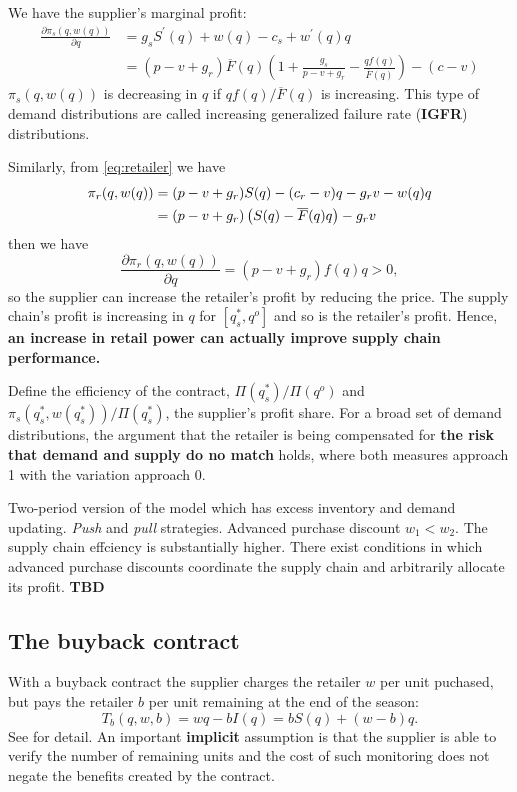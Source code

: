 We have the supplier's marginal profit:
\begin{align*}
    \frac{\partial\pi_s(q,w(q))}{\partial q}&=g_s S^\prime(q)+w(q)-c_s+w^\prime(q)q\\
    &=(p-v+g_r)\overline{F}(q)\left(1+\frac{g_s}{p-v+g_r}-\frac{q f(q)}{\overline{F}(q)}\right)-(c-v)
\end{align*}
$\pi_s(q,w(q))$ is decreasing in $q$ if $qf(q)/\overline{F}(q)$ is increasing. This type of demand distributions are called increasing generalized failure rate (\textbf{IGFR}) distributions.

Similarly, from \ref{eq:retailer} we have 
\begin{align*}
    \pi_r(q,w(q))&=(p-v+g_r)S(q)-(c_r-v)q-g_rv-w(q)q\\
    &=(p-v+g_r)\left(S(q)-\overline{F}(q) q\right)-g_rv
\end{align*}
then we have 
\begin{equation*}
    \frac{\partial\pi_r(q,w(q))}{\partial q}=(p-v+g_r)f(q)q>0,
\end{equation*}
so the supplier can increase the retailer's profit by reducing the price. 
The supply chain's profit is increasing in $q$ for $[q_s^*,q^o]$ and so is the retailer's profit. Hence, \textbf{an increase in retail power can actually improve supply chain performance.} 

Define the efficiency of the contract, $\Pi(q_s^*)/\Pi(q^o)$ and $\pi_s(q_s^*,w(q_s^*))/\Pi(q_s^*)$, the supplier's profit share. For a broad set of demand distributions, the argument that the retailer is being compensated for \textbf{the risk that demand and supply do no match} holds, where both measures approach 1 with the variation approach 0.\cite{lariviere_selling_2001}

Two-period version of the model which has excess inventory and demand updating. \textit{Push} and \textit{pull} strategies. Advanced purchase discount $w_1<w_2$. The supply chain effciency is substantially higher. There exist conditions in which advanced purchase discounts coordinate the supply chain and arbitrarily allocate its profit. \textbf{TBD}

\subsection{The buyback contract}
With a buyback contract the supplier charges the retailer $w$ per unit puchased, but pays the retailer $b$ per unit remaining at the end of the season:
$$T_b(q,w,b)=wq-bI(q)=b S(q)+(w-b)q.$$
See \cite{pasternack_optimal_1985} for detail. An important \textbf{implicit} assumption is that the supplier is able to verify the number of remaining units and the cost of such monitoring does not negate the benefits created by the contract.

